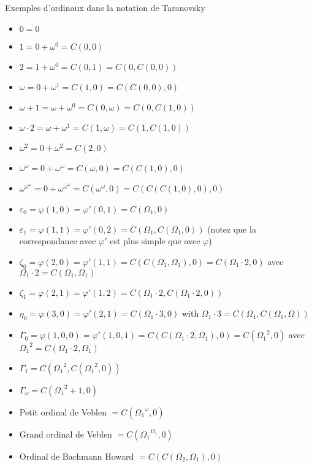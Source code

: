 \documentclass[12pt]{beamer}
\begin{document}
\begin{frame}

Exemples d'ordinaux dans la notation de Taranovsky

\scriptsize

\begin{itemize}
\item \( 0 = 0 \)
\item \( 1 = 0+\omega^0 = C(0,0) \)
\item \( 2 = 1+\omega^0 = C(0,1) = C(0,C(0,0)) \)
\item \( \omega = 0+\omega^1 = C(1,0) = C(C(0,0),0) \)
\item \( \omega+1 = \omega+\omega^0 = C(0,\omega) = C(0,C(1,0)) \)
\item \( \omega \cdot 2 =\omega+\omega^1 = C(1,\omega) = C(1,C(1,0)) \)
\item \( \omega^2 = 0+\omega^2 = C(2,0) \)
\item \( \omega^\omega = 0+\omega^\omega = C(\omega,0) = C(C(1,0),0) \)
\item \( \omega^{\omega^\omega} = 0+\omega^{\omega^\omega} = C(\omega^\omega,0) = C(C(C(1,0),0),0) \)
\item \( \varepsilon_0 = \varphi(1,0) = \varphi'(0,1) = C(\Omega_1,0) \)
\item \( \varepsilon_1 = \varphi(1,1) = \varphi'(0,2) = C(\Omega_1,C(\Omega_1,0)) \) (notez que la correspondance avec \( \varphi' \) est plus simple que avec \( \varphi \))
\item \( \zeta_0 = \varphi(2,0) = \varphi'(1,1) = C(C(\Omega_1,\Omega_1),0) = C(\Omega_1 \cdot 2,0) \) avec \( \Omega_1 \cdot 2 = C(\Omega_1,\Omega_1)
 \)
\item \( \zeta_1 = \varphi(2,1) = \varphi'(1,2) = C(\Omega_1 \cdot 2,C(\Omega_1 \cdot 2,0)) \)
\item \( \eta_0 = \varphi(3,0) = \varphi'(2,1) = C(\Omega_1 \cdot 3,0) \) with \( \Omega_1 \cdot 3 = C(\Omega_1,C(\Omega_1,\Omega)) \)
\item \( \Gamma_0 = \varphi(1,0,0) = \varphi'(1,0,1) = C(C(\Omega_1 \cdot 2,\Omega_1),0) = C({\Omega_1}^2,0) \) avec \( {\Omega_1}^2 = C(\Omega_1 \cdot 2,\Omega_1) \)
\item \( \Gamma_1 = C({\Omega_1}^2,C({\Omega_1}^2,0)) \)
\item \( \Gamma_\omega = C({\Omega_1}^2+1,0) \)
\item Petit ordinal de Veblen \( = C({\Omega_1}^\omega,0) \)
\item Grand ordinal de Veblen \( = C({\Omega_1}^{\Omega_1},0) \)
\item Ordinal de Bachmann Howard \( = C(C(\Omega_2,\Omega_1),0) \)
\end{itemize}

\end{frame}
\end{document}
